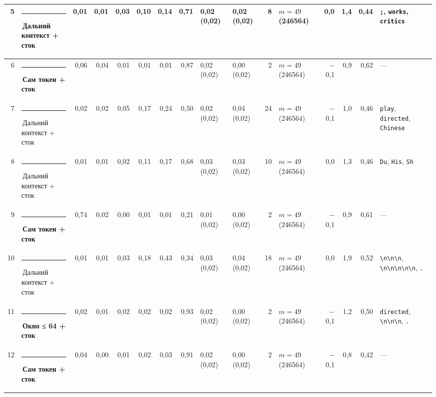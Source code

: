 \documentclass[10pt]{article}
\begin{document}
\begin{minipage}{\linewidth}
\begin{center}
{\begin{tabular}{|r|l|r|r|r|r|r|r|l|l|r|l|r|r|r|l|}
5 & \textcolor[HTML]{C3C2B7}{\rule{0.62em}{0.62em}}\,Дальний контекст + сток & 0,01 & 0,01 & 0,03 & 0,10 & 0,14 & 0,71 & 0,02 (0,02) & 0,02 (0,02) & 8 & $m{=}49$ (246564) & 0,0 & 1,4 & 0,44 & \texttt{\textvisiblespace{};}, \texttt{\textvisiblespace{}works}, \texttt{\textvisiblespace{}critics} \\ \hline
6 & \textcolor[HTML]{2A78D6}{\rule{0.62em}{0.62em}}\,\textbf{Сам токен + сток} & 0,06 & 0,04 & 0,01 & 0,01 & 0,01 & 0,87 & 0,02 (0,02) & 0,00 (0,02) & 2 & $m{=}49$ (246564) & $-$0,1 & 0,9 & 0,62 & — \\ \hline
7 & \textcolor[HTML]{C3C2B7}{\rule{0.62em}{0.62em}}\,Дальний контекст + сток & 0,02 & 0,02 & 0,05 & 0,17 & 0,24 & 0,50 & 0,02 (0,02) & 0,04 (0,02) & 24 & $m{=}49$ (246564) & $-$0,1 & 1,0 & 0,46 & \texttt{\textvisiblespace{}play}, \texttt{\textvisiblespace{}directed}, \texttt{\textvisiblespace{}Chinese} \\ \hline
8 & \textcolor[HTML]{C3C2B7}{\rule{0.62em}{0.62em}}\,Дальний контекст + сток & 0,01 & 0,01 & 0,02 & 0,11 & 0,17 & 0,68 & 0,03 (0,02) & 0,03 (0,02) & 10 & $m{=}49$ (246564) & 0,0 & 1,3 & 0,46 & \texttt{\textvisiblespace{}Du}, \texttt{\textvisiblespace{}His}, \texttt{\textvisiblespace{}Sh} \\ \hline
9 & \textcolor[HTML]{2A78D6}{\rule{0.62em}{0.62em}}\,\textbf{Сам токен + сток} & 0,74 & 0,02 & 0,00 & 0,01 & 0,01 & 0,21 & 0,01 (0,02) & 0,00 (0,02) & 2 & $m{=}49$ (246564) & $-$0,1 & 0,9 & 0,61 & — \\ \hline
10 & \textcolor[HTML]{C3C2B7}{\rule{0.62em}{0.62em}}\,Дальний контекст + сток & 0,01 & 0,01 & 0,03 & 0,18 & 0,43 & 0,34 & 0,03 (0,02) & 0,04 (0,02) & 18 & $m{=}49$ (246564) & 0,0 & 1,9 & 0,52 & \texttt{\textvisiblespace{}\textbackslash{}n\textbackslash{}n\textbackslash{}n}, \texttt{\textvisiblespace{}\textbackslash{}n\textbackslash{}n\textbackslash{}n\textbackslash{}n\textbackslash{}n}, \texttt{\textvisiblespace{}.} \\ \hline
11 & \textcolor[HTML]{EDA100}{\rule{0.62em}{0.62em}}\,\textbf{Окно ≤ 64 + сток} & 0,02 & 0,01 & 0,02 & 0,02 & 0,02 & 0,93 & 0,02 (0,02) & 0,00 (0,02) & 2 & $m{=}49$ (246564) & $-$0,1 & 1,2 & 0,50 & \texttt{\textvisiblespace{}directed}, \texttt{\textvisiblespace{}\textbackslash{}n\textbackslash{}n\textbackslash{}n}, \texttt{\textvisiblespace{}.} \\ \hline
12 & \textcolor[HTML]{2A78D6}{\rule{0.62em}{0.62em}}\,\textbf{Сам токен + сток} & 0,04 & 0,00 & 0,01 & 0,02 & 0,03 & 0,91 & 0,02 (0,02) & 0,00 (0,02) & 2 & $m{=}49$ (246564) & $-$0,1 & 0,8 & 0,42 & — \\ \hline

\end{tabular}}
\end{center}
\end{minipage}
\end{document}
